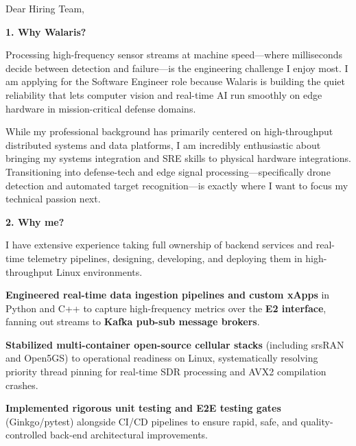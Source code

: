 \documentclass[11pt,a4paper]{coverletter}
\begin{document}

\opening{Dear Hiring Team,}

\vspace{8pt}\noindent\textbf{1. Why Walaris?}\par\vspace{3pt}

Processing high-frequency sensor streams at machine speed—where milliseconds decide between detection and failure—is the engineering challenge I enjoy most. I am applying for the Software Engineer role because Walaris is building the quiet reliability that lets computer vision and real-time AI run smoothly on edge hardware in mission-critical defense domains.

While my professional background has primarily centered on high-throughput distributed systems and data platforms, I am incredibly enthusiastic about bringing my systems integration and SRE skills to physical hardware integrations. Transitioning into defense-tech and edge signal processing—specifically drone detection and automated target recognition—is exactly where I want to focus my technical passion next.

\vspace{8pt}\noindent\textbf{2. Why me?}\par\vspace{3pt}

I have extensive experience taking full ownership of backend services and real-time telemetry pipelines, designing, developing, and deploying them in high-throughput Linux environments.

\bullets

  \item \textbf{Engineered real-time data ingestion pipelines and custom xApps} in Python and C++ to capture high-frequency metrics over the \textbf{E2 interface}, fanning out streams to \textbf{Kafka pub-sub message brokers}.

  \item \textbf{Stabilized multi-container open-source cellular stacks} (including srsRAN and Open5GS) to operational readiness on Linux, systematically resolving priority thread pinning for real-time SDR processing and AVX2 compilation crashes.

  \item \textbf{Implemented rigorous unit testing and E2E testing gates} (Ginkgo/pytest) alongside CI/CD pipelines to ensure rapid, safe, and quality-controlled back-end architectural improvements.
\end{document}
